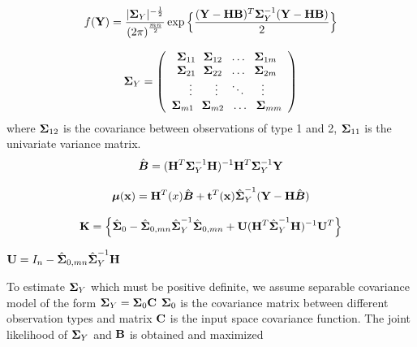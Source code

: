 \begin{equation}\label{like*}
f({\bf Y})= \frac{|{\boldsymbol{\Sigma}}_Y|^{-\frac{1}{2}}}{{(2\pi)}^\frac{mn}{2}}\exp \Big \{\frac{({\bf Y}-{\bf H}{\bf B})^T {\boldsymbol{\Sigma}}_Y^{-1}({\bf Y}-{\bf H}{\bf B})}{2}\Big\}
\end{equation}

\[ {\boldsymbol{\Sigma}}_Y=
\left(\begin{array}{ccc}
{\boldsymbol{\Sigma}}_{11}~~{\boldsymbol{\Sigma}}_{12}~~\ldots~~{\boldsymbol{\Sigma}}_{1m}\\
{\boldsymbol{\Sigma}}_{21}~~{\boldsymbol{\Sigma}}_{22}~~\ldots~~{\boldsymbol{\Sigma}}_{2m}\\
\vdots~~~~~~ \vdots ~~~\ddots~~~~\vdots \\
{\boldsymbol{\Sigma}}_{m1}~~{\boldsymbol{\Sigma}}_{m2}~~\ldots~~{\boldsymbol{\Sigma}}_{mm} \end{array} \right)\]
where ${\boldsymbol{\Sigma}}_{12}$ is the covariance between observations of type 1 and 2, ${\boldsymbol{\Sigma}}_{11}$ is the 
univariate variance matrix. 
$${\hat{\boldsymbol{B}}}=({\bf H}^T{\boldsymbol{\Sigma}}_Y^{-1}{\bf H})^{-1}{\bf H}^T{\boldsymbol{\Sigma}}_Y^{-1}{\bf Y}$$

\begin{equation}\label{man}
{{\boldsymbol{\mu}}}{({\bf x})}= {\bf H}^T(x){\hat{\boldsymbol{B}}}+ {\bf t}^T({\bf x}){\hat{\boldsymbol{\Sigma}}}_Y^{-1}({\bf Y} -{\bf H}{\hat{\boldsymbol{B}}})
\end{equation}

\begin{multline}\label{olu2b}
\begin{split}
{{\mathbf{K}}}= \Big \{{\hat{\boldsymbol{\Sigma}}}_0 -{\hat{\boldsymbol{\Sigma}}}_{0,mn}{\hat{\boldsymbol{\Sigma}}}_Y^{-1}{\hat{\boldsymbol{\Sigma}}}_{0,mn}  +  {\bf U} ({\bf H}^T{\hat{\boldsymbol{\Sigma}}}_Y^{-1}{\bf H})^{-1}{\bf U}^T\Big \}
\end{split}
\end{multline}


 $ {\bf U}= I_n-{\hat{\boldsymbol{\Sigma}}}_{0,mn}{\hat{\boldsymbol{\Sigma}}}_Y^{-1}{\bf H}$

 To estimate ${\boldsymbol{\Sigma}}_Y$ which must be positive definite, we assume separable covariance model of the form ${\boldsymbol{\Sigma}}_Y={\boldsymbol{\Sigma}}_0{\bf C}$
 ${\boldsymbol{\Sigma}}_0$ is the covariance matrix between different observation types and matrix ${\bf C}$ is the input space covariance function. The joint likelihood of ${\boldsymbol{\Sigma}}_Y$ and ${\bf B}$ is obtained and maximized


